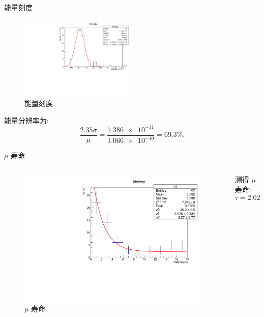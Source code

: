 \documentclass[10pt]{beamer}
\begin{document}
\begin{frame}[label={sec:org1764341}]{能量刻度}
\begin{figure}[htbp]
\centering
\includegraphics[width=0.5\textwidth]{../../DetectorPerform/ECali/qqdist.pdf}
\caption{能量刻度}
\end{figure}

能量分辨率为:
\begin{equation}
\label{eq:4}
\frac{2.35\sigma}{\mu} = \frac{\num{7.386e-11}}{\num{1.066e-10}} = 69.3\%.
\end{equation}
\end{frame}


\begin{frame}[label={sec:org9740b1e}]{\(\mu\) 寿命}
\begin{columns}
\begin{column}{0.5\columnwidth}
\begin{figure}[htbp]
\centering
\includegraphics[width=1.0\textwidth]{../../img/lifeTimeHist.pdf}
\caption{\(\mu\) 寿命}
\end{figure}
\end{column}

\begin{column}{0.5\columnwidth}
测得 \(\mu\) 寿命:  
\begin{equation}
\label{eq:5}
\tau = 2.026 \pm \qty{0.534}{\mu s}.
\end{equation}
\end{column}
\end{columns}
\end{frame}
\end{document}
